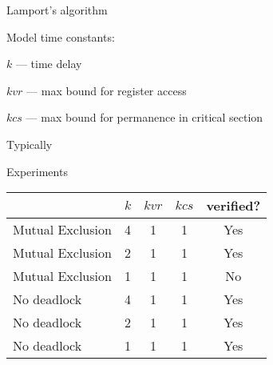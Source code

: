 \documentclass{beamer}
\def\dkb#1{{\blue #1}}
\begin{document}
\begin{slide}{Lamport's algorithm}
\small
\begin{block}{Model time constants:}
\begin{description}
\item \dkb{$k$} --- time delay
\item \dkb{$kvr$} --- max bound for register access
\item \dkb{$kcs$} --- max bound for permanence in critical section 
\end{description}
Typically
\vspace{-4mm}
\begin{center}
\end{center}
\end{block}
\vspace{-2mm}

\begin{block}{Experiments}
\centering
\begin{tabular}{|l|c|c|c|c|}
\hline
& $k$ & $kvr$ & $kcs$ & verified? \\
\hline
Mutual Exclusion & 4 & 1 & 1 & Yes\\
Mutual Exclusion & 2 & 1 & 1 & Yes\\
Mutual Exclusion & 1 & 1 & 1 & No\\
No deadlock & 4 & 1 & 1 & Yes\\
No deadlock & 2 & 1 & 1 & Yes\\
No deadlock  & 1 & 1 & 1 & Yes\\
\hline
\end{tabular}
\end{block}
\end{slide}

%
%
%
%
%
%
%
%
\end{document}
